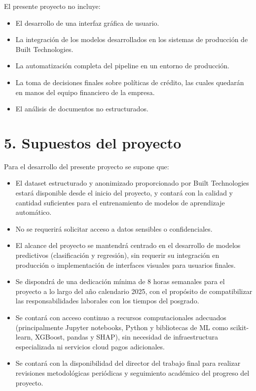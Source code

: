 \documentclass[
11pt, %
]{charter}
\begin{document}
El presente proyecto no incluye:

\begin{itemize}
    \item El desarrollo de una interfaz gráfica de usuario.
    \item La integración de los modelos desarrollados en los sistemas de producción de Built Technologies.
    \item La automatización completa del pipeline en un entorno de producción.
    \item La toma de decisiones finales sobre políticas de crédito, las cuales quedarán en manos del equipo financiero de la empresa.
    \item El análisis de documentos no estructurados.
\end{itemize}


\section{5. Supuestos del proyecto}
\label{sec:supuestos}


Para el desarrollo del presente proyecto se supone que:

\begin{itemize}
    \item El dataset estructurado y anonimizado proporcionado por Built Technologies estará disponible desde el inicio del proyecto, y contará con la calidad y cantidad suficientes para el entrenamiento de modelos de aprendizaje automático.
    \item No se requerirá solicitar acceso a datos sensibles o confidenciales.
    \item El alcance del proyecto se mantendrá centrado en el desarrollo de modelos predictivos (clasificación y regresión), sin requerir su integración en producción o implementación de interfaces visuales para usuarios finales.
    \item Se dispondrá de una dedicación mínima de 8 horas semanales para el proyecto a lo largo del año calendario 2025, con el propósito de compatibilizar las responsabilidades laborales con los tiempos del posgrado.
    \item Se contará con acceso continuo a recursos computacionales adecuados (principalmente Jupyter notebooks, Python y bibliotecas de ML como scikit-learn, XGBoost, pandas y SHAP), sin necesidad de infraestructura especializada ni servicios cloud pagos adicionales.
    \item Se contará con la disponibilidad del director del trabajo final para realizar revisiones metodológicas periódicas y seguimiento académico del progreso del proyecto.
\end{itemize}
\end{document}
